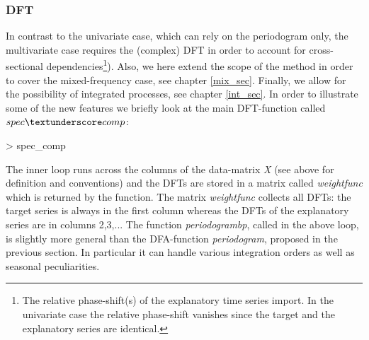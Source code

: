 \documentclass[a4paper]{book}
\begin{document}
\subsubsection{DFT}

In contrast to the univariate case, which can rely on the periodogram only, the multivariate case requires the (complex) DFT in order to account for cross-sectional dependencies\footnote{The relative phase-shift(s) of the explanatory time series import. In the univariate case the relative phase-shift vanishes since the target and the explanatory series are identical.}). Also, we here extend the scope of the method in order to cover the mixed-frequency case, see chapter \ref{mix_sec}. Finally, we allow for the possibility of integrated processes, see chapter \ref{int_sec}. In order to illustrate some of the new features we briefly look at the main DFT-function called $spec\textunderscore comp$:
\begin{Schunk}
\begin{Sinput}
> spec_comp
\end{Sinput}
\end{Schunk}
The inner loop runs across the columns of the data-matrix \emph{X} (see above for definition and conventions) and the DFTs are stored in a matrix called \emph{weight\textunderscore func} which is returned by the function. The matrix \emph{weight\textunderscore func} collects all DFTs: the target series is always in the first column whereas the DFTs of the explanatory series are in columns 2,3,... The function \emph{periodogram\textunderscore bp}, called in the above loop, is slightly more general than the DFA-function \emph{periodogram}, proposed in the previous section. In particular it can handle various integration orders as well as seasonal peculiarities.  \\
\end{document}

